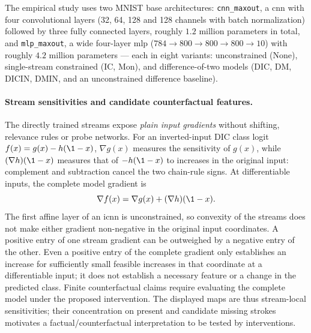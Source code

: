 The empirical study uses two MNIST base architectures: \texttt{cnn\_maxout}, a \ac{cnn} with four convolutional layers (32, 64, 128 and 128 channels with batch normalization) followed by three fully connected layers, roughly $1.2$ million parameters in total, and \texttt{mlp\_maxout}, a wide four-layer \ac{mlp} ($784 \to 800 \to 800 \to 800 \to 10$) with roughly $4.2$ million parameters --- each in eight variants: unconstrained (None), single-stream constrained (IC, Mon), and difference-of-two models (DIC, DM, DICIN, DMIN, and an unconstrained difference baseline).

\paragraph{Stream sensitivities and candidate counterfactual features.}\label{subsec:counterfactual_features}

The directly trained streams expose \emph{plain input gradients} without shifting, relevance rules or probe networks. For an inverted-input DIC class logit $f(x)=g(x)-h(\1-x)$, $\nabla g(x)$ measures the sensitivity of $g(x)$, while $(\nabla h)(\1-x)$ measures that of $-h(\1-x)$ to increases in the original input: complement and subtraction cancel the two chain-rule signs. At differentiable inputs, the complete model gradient is
\begin{equation*}
	\nabla f(x)=\nabla g(x)+(\nabla h)(\1-x).
\end{equation*}
The first affine layer of an \ac{icnn} is unconstrained, so convexity of the streams does not make either gradient non-negative in the original input coordinates. A positive entry of one stream gradient can be outweighed by a negative entry of the other. Even a positive entry of the complete gradient only establishes an increase for sufficiently small feasible increases in that coordinate at a differentiable input; it does not establish a necessary feature or a change in the predicted class. Finite counterfactual claims require evaluating the complete model under the proposed intervention. The displayed maps are thus stream-local sensitivities; their concentration on present and candidate missing strokes motivates a factual/counterfactual interpretation to be tested by interventions.


